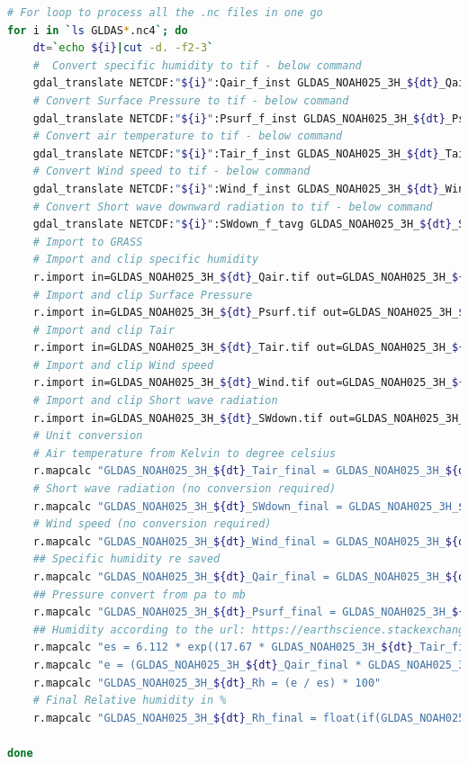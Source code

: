 \begin{lstlisting}[language=Bash]
# For loop to process all the .nc files in one go
for i in `ls GLDAS*.nc4`; do
    dt=`echo ${i}|cut -d. -f2-3`
    #  Convert specific humidity to tif - below command
    gdal_translate NETCDF:"${i}":Qair_f_inst GLDAS_NOAH025_3H_${dt}_Qair.tif
    # Convert Surface Pressure to tif - below command
    gdal_translate NETCDF:"${i}":Psurf_f_inst GLDAS_NOAH025_3H_${dt}_Psurf.tif
    # Convert air temperature to tif - below command
    gdal_translate NETCDF:"${i}":Tair_f_inst GLDAS_NOAH025_3H_${dt}_Tair.tif
    # Convert Wind speed to tif - below command
    gdal_translate NETCDF:"${i}":Wind_f_inst GLDAS_NOAH025_3H_${dt}_Wind.tif
    # Convert Short wave downward radiation to tif - below command
    gdal_translate NETCDF:"${i}":SWdown_f_tavg GLDAS_NOAH025_3H_${dt}_SWdown.tif
    # Import to GRASS
    # Import and clip specific humidity
    r.import in=GLDAS_NOAH025_3H_${dt}_Qair.tif out=GLDAS_NOAH025_3H_${dt}_Qair -o
    # Import and clip Surface Pressure
    r.import in=GLDAS_NOAH025_3H_${dt}_Psurf.tif out=GLDAS_NOAH025_3H_${dt}_Psurf -o
    # Import and clip Tair
    r.import in=GLDAS_NOAH025_3H_${dt}_Tair.tif out=GLDAS_NOAH025_3H_${dt}_Tair -o
    # Import and clip Wind speed
    r.import in=GLDAS_NOAH025_3H_${dt}_Wind.tif out=GLDAS_NOAH025_3H_${dt}_Wind -o
    # Import and clip Short wave radiation
    r.import in=GLDAS_NOAH025_3H_${dt}_SWdown.tif out=GLDAS_NOAH025_3H_${dt}_SWdown -o
    # Unit conversion
    # Air temperature from Kelvin to degree celsius
    r.mapcalc "GLDAS_NOAH025_3H_${dt}_Tair_final = GLDAS_NOAH025_3H_${dt}_Tair - 273.15"
    # Short wave radiation (no conversion required)
    r.mapcalc "GLDAS_NOAH025_3H_${dt}_SWdown_final = GLDAS_NOAH025_3H_${dt}_SWdown"
    # Wind speed (no conversion required)
    r.mapcalc "GLDAS_NOAH025_3H_${dt}_Wind_final = GLDAS_NOAH025_3H_${dt}_Wind"
    ## Specific humidity re saved
    r.mapcalc "GLDAS_NOAH025_3H_${dt}_Qair_final = GLDAS_NOAH025_3H_${dt}_Qair"
    ## Pressure convert from pa to mb
    r.mapcalc "GLDAS_NOAH025_3H_${dt}_Psurf_final = GLDAS_NOAH025_3H_${dt}_Psurf / 100"
    ## Humidity according to the url: https://earthscience.stackexchange.com/questions/2360/how-do-i-convert-specific-humidity-to-relative-humidity
    r.mapcalc "es = 6.112 * exp((17.67 * GLDAS_NOAH025_3H_${dt}_Tair_final) / (GLDAS_NOAH025_3H_${dt}_Tair_final + 243.5))"
    r.mapcalc "e = (GLDAS_NOAH025_3H_${dt}_Qair_final * GLDAS_NOAH025_3H_${dt}_Psurf_final) / (0.378 * GLDAS_NOAH025_3H_${dt}_Qair_final + 0.622)"
    r.mapcalc "GLDAS_NOAH025_3H_${dt}_Rh = (e / es) * 100"
    # Final Relative humidity in %
    r.mapcalc "GLDAS_NOAH025_3H_${dt}_Rh_final = float(if(GLDAS_NOAH025_3H_${dt}_Rh > 100, 100, if(GLDAS_NOAH025_3H_${dt}_Rh < 0, 0, GLDAS_NOAH025_3H_${dt}_Rh)))"

done
\end{lstlisting}
